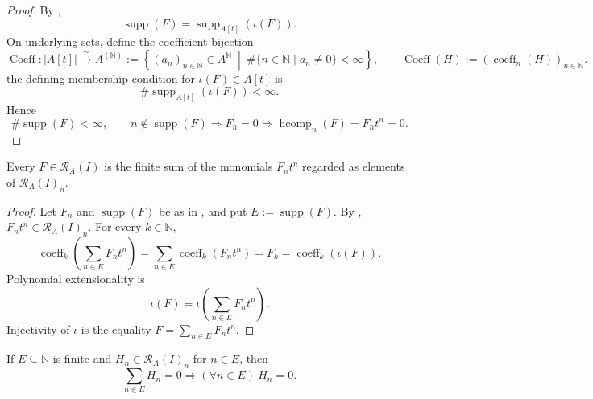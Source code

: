 \begin{proof}
  \leanok
  By ,
  \[
    \operatorname{supp}(F)
      =\operatorname{supp}_{A[t]}(\iota(F)).
  \]
  On underlying sets, define the coefficient bijection
  \[
    \operatorname{Coeff}\colon |A[t]|\xrightarrow{\ \sim\ }
      A^{(\mathbb N)}
      :=\left\{(a_n)_{n\in\mathbb N}\in A^{\mathbb N}
        \ \middle|\
        \#\{n\in\mathbb N\mid a_n\ne0\}<\infty\right\},
    \qquad
    \operatorname{Coeff}(H)
      :=(\operatorname{coeff}_n(H))_{n\in\mathbb N}.
  \]
  the defining membership condition for $\iota(F)\in A[t]$ is
  \[
    \#\operatorname{supp}_{A[t]}(\iota(F))<\infty.
  \]
  Hence
  \[
    \#\operatorname{supp}(F)<\infty,
    \qquad
    n\notin\operatorname{supp}(F)
      \Longrightarrow F_n=0
      \Longrightarrow\operatorname{hcomp}_n(F)=F_nt^n=0.
  \]
\end{proof}

\begin{lemma}
  \label{lemma:nagata-rees-sum-components}
  \leanok

  Every $F\in\mathcal R_A(I)$ is the finite sum of the monomials
  $F_nt^n$ regarded as elements of $\mathcal R_A(I)_n$.
\end{lemma}

\begin{proof}
  \leanok
  Let $F_n$ and $\operatorname{supp}(F)$ be as in
  , and put
  $E:=\operatorname{supp}(F)$.  By
  ,
  $F_nt^n\in\mathcal R_A(I)_n$.  For every $k\in\mathbb N$,
  \[
    \operatorname{coeff}_k\!\left(\sum_{n\in E}F_nt^n\right)
      =\sum_{n\in E}\operatorname{coeff}_k(F_nt^n)
      =F_k
      =\operatorname{coeff}_k(\iota(F)).
  \]
  Polynomial extensionality is
  \[
    \iota(F)=\iota\!\left(\sum_{n\in E}F_nt^n\right).
  \]
  Injectivity of $\iota$ is the equality
  $F=\sum_{n\in E}F_nt^n$.
\end{proof}

\begin{lemma}
  \label{lemma:nagata-rees-components-unique}
  \leanok

  If $E\subseteq\mathbb N$ is finite and
  $H_n\in\mathcal R_A(I)_n$ for $n\in E$, then
  \[
    \sum_{n\in E}H_n=0
      \Longrightarrow (\forall n\in E)\ H_n=0.
  \]
\end{lemma}

